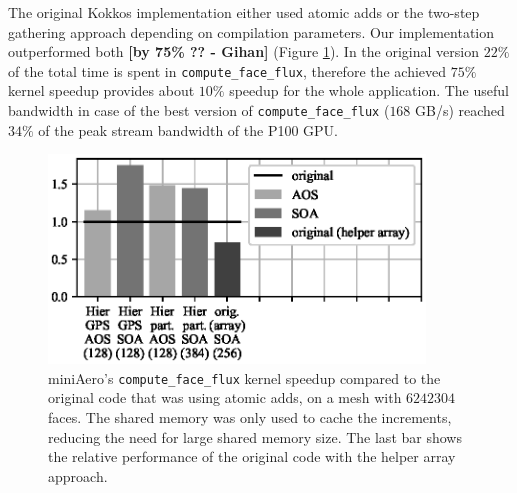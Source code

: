 The original Kokkos implementation either used atomic adds or the two-step
gathering approach depending on compilation parameters. Our implementation
outperformed both \textbf{[by 75\% ?? - Gihan]} (Figure 
\ref{fig:mini_aero_speedup_small-cache}). In the original version $22\%$ of the 
total time is spent in \texttt{compute\_face\_flux}, therefore the achieved 
$75\%$ kernel speedup provides about $10\%$ speedup for the whole application. 
The useful bandwidth in case of the best version of 
\texttt{compute\_face\_flux} ($168$ GB/s) reached $34\%$ of the peak stream 
bandwidth of the P100 GPU.

\begin{figure}[Htbp]
\centering
\includegraphics[width=10cm]{fig/mini_aero_speedup_nocache.eps}
\caption{miniAero's \texttt{compute\_face\_flux} kernel speedup compared to 
the original code that was using atomic adds, on a mesh with $6242304$ faces. 
The shared memory was only used to cache the increments, reducing the need 
for large shared memory size. The last bar shows the relative performance of 
the original code with the helper array approach.}  
\label{fig:mini_aero_speedup_small-cache}
\end{figure}

